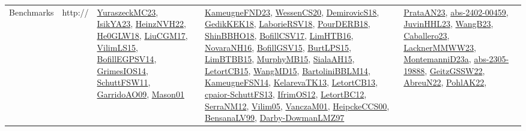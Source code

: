 {\begin{longtable}{llp{6cm}p{6cm}p{6cm}}
Benchmarks & http:// & \href{papers/YuraszeckMC23.pdf}{YuraszeckMC23}\cite{YuraszeckMC23}, \href{articles/IsikYA23.pdf}{IsikYA23}\cite{IsikYA23}, \href{articles/HeinzNVH22.pdf}{HeinzNVH22}\cite{HeinzNVH22}, \href{papers/He0GLW18.pdf}{He0GLW18}\cite{He0GLW18}, \href{papers/LiuCGM17.pdf}{LiuCGM17}\cite{LiuCGM17}, \href{papers/VilimLS15.pdf}{VilimLS15}\cite{VilimLS15}, \href{papers/BofillEGPSV14.pdf}{BofillEGPSV14}\cite{BofillEGPSV14}, \href{articles/GrimesIOS14.pdf}{GrimesIOS14}\cite{GrimesIOS14}, \href{articles/SchuttFSW11.pdf}{SchuttFSW11}\cite{SchuttFSW11}, \href{articles/GarridoAO09.pdf}{GarridoAO09}\cite{GarridoAO09}, \href{articles/Mason01.pdf}{Mason01}\cite{Mason01} & \href{papers/KameugneFND23.pdf}{KameugneFND23}\cite{KameugneFND23}, \href{papers/WessenCS20.pdf}{WessenCS20}\cite{WessenCS20}, \href{papers/DemirovicS18.pdf}{DemirovicS18}\cite{DemirovicS18}, \href{articles/GedikKEK18.pdf}{GedikKEK18}\cite{GedikKEK18}, \href{articles/LaborieRSV18.pdf}{LaborieRSV18}\cite{LaborieRSV18}, \href{articles/PourDERB18.pdf}{PourDERB18}\cite{PourDERB18}, \href{articles/ShinBBHO18.pdf}{ShinBBHO18}\cite{ShinBBHO18}, \href{papers/BofillCSV17.pdf}{BofillCSV17}\cite{BofillCSV17}, \href{papers/LimHTB16.pdf}{LimHTB16}\cite{LimHTB16}, \href{articles/NovaraNH16.pdf}{NovaraNH16}\cite{NovaraNH16}, \href{papers/BofillGSV15.pdf}{BofillGSV15}\cite{BofillGSV15}, \href{papers/BurtLPS15.pdf}{BurtLPS15}\cite{BurtLPS15}, \href{papers/LimBTBB15.pdf}{LimBTBB15}\cite{LimBTBB15}, \href{papers/MurphyMB15.pdf}{MurphyMB15}\cite{MurphyMB15}, \href{papers/SialaAH15.pdf}{SialaAH15}\cite{SialaAH15}, \href{articles/LetortCB15.pdf}{LetortCB15}\cite{LetortCB15}, \href{articles/WangMD15.pdf}{WangMD15}\cite{WangMD15}, \href{papers/BartoliniBBLM14.pdf}{BartoliniBBLM14}\cite{BartoliniBBLM14}, \href{articles/KameugneFSN14.pdf}{KameugneFSN14}\cite{KameugneFSN14}, \href{papers/KelarevaTK13.pdf}{KelarevaTK13}\cite{KelarevaTK13}, \href{papers/LetortCB13.pdf}{LetortCB13}\cite{LetortCB13}, \href{papers/cpaior-SchuttFS13.pdf}{cpaior-SchuttFS13}\cite{cpaior-SchuttFS13}, \href{papers/IfrimOS12.pdf}{IfrimOS12}\cite{IfrimOS12}, \href{papers/LetortBC12.pdf}{LetortBC12}\cite{LetortBC12}, \href{papers/SerraNM12.pdf}{SerraNM12}\cite{SerraNM12}, \href{papers/Vilim05.pdf}{Vilim05}\cite{Vilim05}, \href{papers/VanczaM01.pdf}{VanczaM01}\cite{VanczaM01}, \href{articles/HeipckeCCS00.pdf}{HeipckeCCS00}\cite{HeipckeCCS00}, \href{articles/BensanaLV99.pdf}{BensanaLV99}\cite{BensanaLV99}, \href{articles/Darby-DowmanLMZ97.pdf}{Darby-DowmanLMZ97}\cite{Darby-DowmanLMZ97} & \href{articles/PrataAN23.pdf}{PrataAN23}\cite{PrataAN23}, \href{articles/abs-2402-00459.pdf}{abs-2402-00459}\cite{abs-2402-00459}, \href{papers/JuvinHHL23.pdf}{JuvinHHL23}\cite{JuvinHHL23}, \href{papers/WangB23.pdf}{WangB23}\cite{WangB23}, \href{articles/Caballero23.pdf}{Caballero23}\cite{Caballero23}, \href{articles/LacknerMMWW23.pdf}{LacknerMMWW23}\cite{LacknerMMWW23}, \href{articles/MontemanniD23a.pdf}{MontemanniD23a}\cite{MontemanniD23a}, \href{articles/abs-2305-19888.pdf}{abs-2305-19888}\cite{abs-2305-19888}, \href{papers/GeitzGSSW22.pdf}{GeitzGSSW22}\cite{GeitzGSSW22}, \href{articles/AbreuN22.pdf}{AbreuN22}\cite{AbreuN22}, \href{articles/PohlAK22.pdf}{PohlAK22}\cite{PohlAK22}, 
\end{longtable}}
